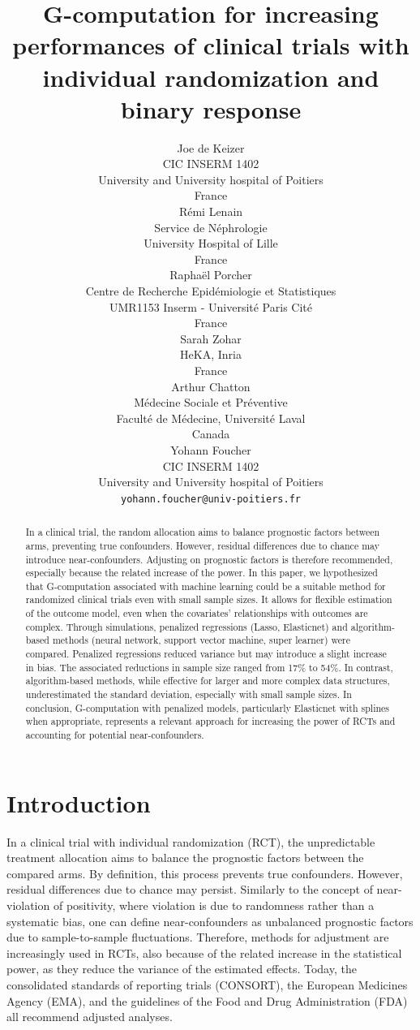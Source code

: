 \documentclass{article}
\title{G-computation for increasing performances of clinical trials with individual randomization and binary response}
\author{
  Joe de Keizer \\
  CIC INSERM 1402 \\
  University and University hospital of Poitiers \\
  France \\
   \And
  Rémi Lenain\\
  Service de Néphrologie\\
  University Hospital of Lille\\
  France\\
  \And
  Raphaël Porcher\\
  Centre de Recherche Epidémiologie et Statistiques\\
  UMR1153 Inserm - Université Paris Cité\\
  France\\
   \And
  Sarah Zohar\\
  HeKA,  Inria\\
  France\\
    \And
  Arthur Chatton \\
  Médecine Sociale et Préventive \\
  Faculté de Médecine, Université Laval \\
  Canada \\
  \And
  Yohann Foucher \\
  CIC INSERM 1402 \\
  University and University hospital of Poitiers \\
  \texttt{yohann.foucher@univ-poitiers.fr} \\
}
\begin{document}
\maketitle

\begin{abstract}
In a clinical trial, the random allocation aims to balance prognostic factors between arms, preventing true confounders. However, residual differences due to chance may introduce near-confounders. Adjusting on prognostic factors is therefore recommended, especially because the related increase of the power. In this paper, we hypothesized that G-computation associated with machine learning could be a suitable method for randomized clinical trials even with small sample sizes. It allows for flexible estimation of the outcome model, even when the covariates' relationships with outcomes are complex. Through simulations, penalized regressions (Lasso, Elasticnet) and algorithm-based methods (neural network, support vector machine, super learner) were compared. Penalized regressions reduced variance but may introduce a slight increase in bias. The associated reductions in sample size ranged from 17\% to 54\%. In contrast, algorithm-based methods, while effective for larger and more complex data structures, underestimated the standard deviation, especially with small sample sizes. In conclusion, G-computation with penalized models, particularly Elasticnet with splines when appropriate, represents a relevant approach for increasing the power of RCTs and accounting for potential near-confounders.
\end{abstract}



\section{Introduction}\label{sec1}

In a clinical trial with individual randomization (RCT),  the unpredictable treatment allocation aims to balance the prognostic factors between the compared arms. By definition, this process prevents true confounders. However, residual differences due to chance may persist. Similarly to the concept of near-violation of positivity, \cite{leger_causal_2022} where violation is due to randomness rather than a systematic bias, one can define near-confounders as unbalanced prognostic factors due to sample-to-sample fluctuations. \cite{austin_statistical_2010} Therefore, methods for adjustment are increasingly used in RCTs, also because of the related increase in the statistical power, as they reduce the variance of the estimated effects. \cite{lingsma_covariate_2010, williamson_variance_2014, senn_statistical_2021} Today, the consolidated standards of reporting trials (CONSORT), the European Medicines Agency (EMA), and the guidelines of the Food and Drug Administration (FDA) all recommend adjusted analyses.\cite{noauthor_consort_2010,center_for_drug_evaluation_and_research_fda_adjusting_2023,european_medical_agency_guideline_2015}
\end{document}
